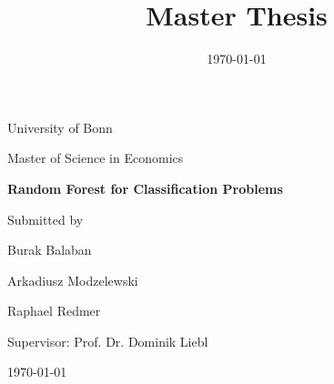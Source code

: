 \documentclass[12pt,a4paper]{scrartcl}
\title{Master Thesis}
\date{\today}
\begin{document}
	\begin{titlepage}
		\centering
		University of Bonn
		
		Master of Science in Economics
		\vspace{1in}
		\vspace{1in}
		
		{\LARGE \bfseries  Random Forest for Classification Problems}
		\vspace{1in}
		
		{\large Submitted by}
		
		{\LARGE Burak Balaban \par
				Arkadiusz Modzelewski\par
				Raphael Redmer\par}
		
		\vspace{1in}
		
			Supervisor: Prof. Dr. Dominik Liebl
			
		\vfill
		
		\begin{flushleft}
			\today
		\end{flushleft}
		
	\end{titlepage}
	
	
	\newpage	
	\tableofcontents
	\thispagestyle{empty}
	\newpage


	

	

	

	

	

	

%	
	

	\pagebreak

	\printbibliography

			

\end{document}
